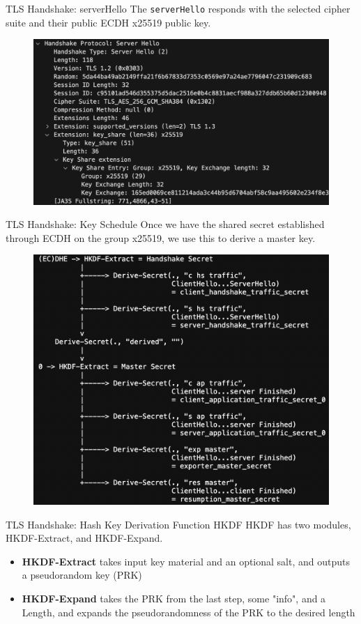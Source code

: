 \documentclass{beamer}
\begin{document}
\begin{frame}{TLS Handshake: serverHello}
    The \texttt{serverHello} responds with the selected cipher suite and their public ECDH x25519 public key.
    \begin{figure}
        \centering
        \includegraphics[width=0.9\linewidth]{figures/sh_dh.png}
    \end{figure}

\end{frame}


\begin{frame}{TLS Handshake: Key Schedule}
    Once we have the shared secret established through ECDH on the group x25519, we use this to derive a master key.
    \begin{figure}
        \centering
        \includegraphics[width=0.7\linewidth]{figures/key_derivation_schedule.png}
    \end{figure}
\end{frame}

\begin{frame}{TLS Handshake: Hash Key Derivation Function HKDF}
    HKDF has two modules, HKDF-Extract, and HKDF-Expand.
    \begin{itemize}
        \item \textbf{HKDF-Extract} takes input key material and an optional salt, and outputs a pseudorandom key (PRK)
        \item \textbf{HKDF-Expand} takes the PRK from the last step, some "info", and a Length, and expands the pseudorandomness of the PRK to the desired length 
    \end{itemize}
\end{frame}
\end{document}
